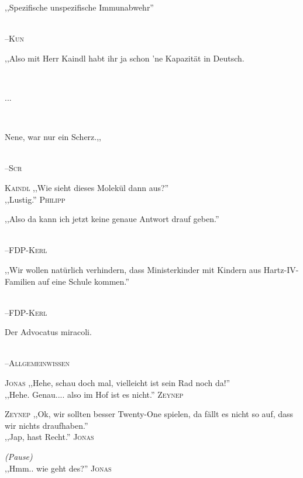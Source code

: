 \vspace{3mm}
{\raggedright ,,Spezifische unspezifische Immunabwehr''}\\
\raggedleft \textsc{\footnotesize --\/Kun}\\

\vspace{3mm}
{\raggedright ,,Also mit Herr Kaindl habt ihr ja schon 'ne Kapazität in Deutsch.}\\
{\raggedright ...}\\
{\raggedright Nene, war nur ein Scherz.,,}\\
\raggedleft \textsc{\footnotesize --\/Scr}\\

\vspace{3mm}
\hangindent=0.7cm
\raggedright \textsc{\footnotesize Kaindl} ,,Wie sieht dieses Molekül dann aus?''\\
\raggedleft ,,Lustig.'' \textsc{\footnotesize Philipp}\\

\vspace{3mm}
{\raggedright ,,Also da kann ich jetzt keine genaue Antwort drauf geben.''}\\
\raggedleft \textsc{\footnotesize --\/FDP-Kerl}\\

\vspace{3mm}
{\raggedright ,,Wir wollen natürlich verhindern, dass Ministerkinder mit Kindern aus Hartz-IV-Familien auf eine Schule kommen.''}\\
\raggedleft \textsc{\footnotesize --\/FDP-Kerl}\\

\vspace{3mm}
{\raggedright Der Advocatus miracoli.}\\
\raggedleft \textsc{\footnotesize --\/Allgemeinwissen}\\

\vspace{3mm}
\hangindent=0.7cm
\raggedright \textsc{\footnotesize Jonas} ,,Hehe, schau doch mal, vielleicht ist sein Rad noch da!''\\
\raggedleft ,,Hehe. Genau.... also im Hof ist es nicht.'' \textsc{\footnotesize Zeynep}\\

\vspace{3mm}
\hangindent=0.7cm
\raggedright \textsc{\footnotesize Zeynep} ,,Ok, wir sollten besser Twenty-One spielen, da fällt es nicht so auf, dass wir nichts draufhaben.''\\
\raggedleft ,,Jap, hast Recht.'' \textsc{\footnotesize Jonas}\\
\raggedright \emph{\footnotesize (Pause)}\\
\raggedleft ,,Hmm.. wie geht des?'' \textsc{\footnotesize Jonas}\\

